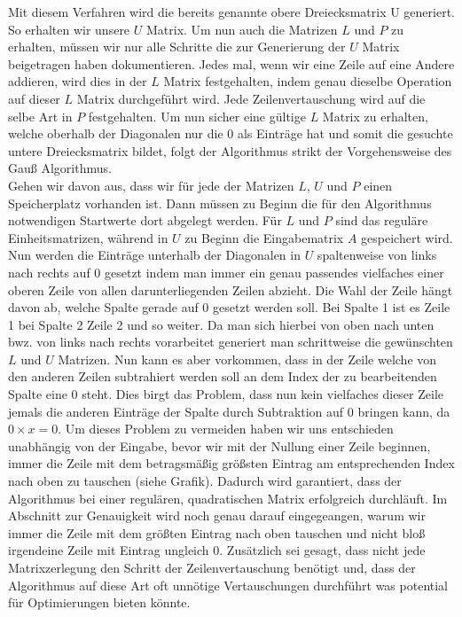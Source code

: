 \documentclass[course=erap]{aspdoc}
\begin{document}
Mit diesem Verfahren wird die bereits genannte obere Dreiecksmatrix U generiert. So erhalten wir unsere $U$ Matrix. 
Um nun auch die Matrizen $L$ und $P$ zu erhalten, müssen wir nur alle Schritte die zur Generierung 
der $U$ Matrix beigetragen haben dokumentieren. Jedes mal, wenn wir eine Zeile auf eine Andere addieren,
wird dies in der $L$ Matrix festgehalten, indem genau dieselbe Operation auf dieser $L$ Matrix durchgeführt wird. 
Jede Zeilenvertauschung wird auf die selbe Art in $P$ festgehalten.  Um nun sicher eine gültige $L$ Matrix zu erhalten, 
welche oberhalb der Diagonalen nur die 0 als Einträge hat und somit die gesuchte untere Dreiecksmatrix bildet, 
folgt der Algorithmus strikt der Vorgehensweise des Gauß Algorithmus.\\

Gehen wir davon aus, dass wir für jede der Matrizen $L$, $U$ und $P$ einen Speicherplatz vorhanden ist.
Dann müssen zu Beginn die für den Algorithmus notwendigen Startwerte dort abgelegt werden. Für $L$ und $P$ sind das 
reguläre Einheitsmatrizen, während in $U$ zu Beginn die Eingabematrix $A$ gespeichert wird. Nun werden die Einträge unterhalb 
der Diagonalen in $U$ spaltenweise von links nach rechts auf 0 gesetzt indem man immer ein genau passendes vielfaches 
einer oberen Zeile von allen darunterliegenden Zeilen abzieht. Die Wahl der Zeile hängt davon ab, welche Spalte gerade 
auf 0 gesetzt werden soll. Bei Spalte 1 ist es Zeile 1 bei Spalte 2 Zeile 2 und so weiter. Da man sich hierbei von oben 
nach unten bwz. von links nach rechts vorarbeitet generiert man schrittweise die gewünschten $L$ und $U$ Matrizen. 
Nun kann es aber vorkommen, dass in der Zeile welche von den anderen Zeilen subtrahiert werden soll an dem Index 
der zu bearbeitenden Spalte eine 0 steht. Dies birgt das Problem, dass nun kein vielfaches dieser Zeile jemals 
die anderen Einträge der Spalte durch Subtraktion auf 0 bringen kann, da $ 0 \times x = 0$. Um dieses Problem zu vermeiden 
haben wir uns entschieden unabhängig von der Eingabe, bevor wir mit der Nullung einer Zeile beginnen, immer die Zeile mit dem betragsmäßig größsten Eintrag
am entsprechenden Index nach oben zu tauschen (siehe Grafik). Dadurch wird garantiert, dass der Algorithmus bei einer 
regulären, quadratischen Matrix erfolgreich durchläuft. Im Abschnitt zur Genauigkeit wird noch genau darauf 
eingegeangen, warum wir immer die Zeile mit dem größten Eintrag nach oben tauschen und nicht bloß irgendeine Zeile 
mit Eintrag ungleich 0. Zusätzlich sei gesagt, dass nicht jede Matrixzerlegung den Schritt der Zeilenvertauschung 
benötigt und, dass der Algorithmus auf diese Art oft unnötige Vertauschungen durchführt was potential für 
Optimierungen bieten könnte.\\
 
\end{document}
